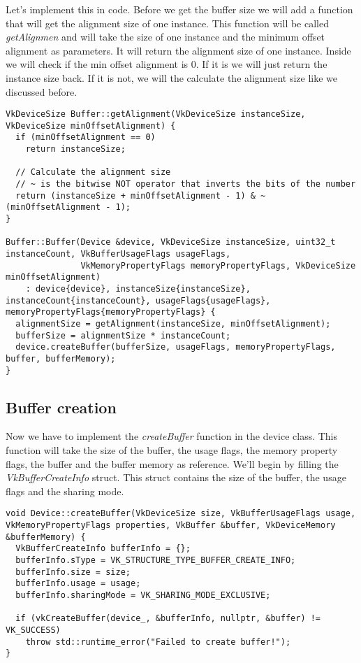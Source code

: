 \documentclass[12pt]{report} \usepackage{preamble}
\begin{document}
Let's implement this in code.
Before we get the buffer size we will add a function that will get the alignment size of one instance. This function will be called \textit{getAlignmen}
and will take the size of one instance and the minimum offset alignment as parameters. It will return the alignment size of one instance.
Inside we will check if the min offset alignment is 0. If it is we will just return the instance size back. If it is not, we will
the calculate the alignment size like we discussed before.

\begin{lstlisting}[Language=C++]
VkDeviceSize Buffer::getAlignment(VkDeviceSize instanceSize, VkDeviceSize minOffsetAlignment) {
  if (minOffsetAlignment == 0)
    return instanceSize;

  // Calculate the alignment size
  // ~ is the bitwise NOT operator that inverts the bits of the number
  return (instanceSize + minOffsetAlignment - 1) & ~(minOffsetAlignment - 1);
}

Buffer::Buffer(Device &device, VkDeviceSize instanceSize, uint32_t instanceCount, VkBufferUsageFlags usageFlags, 
               VkMemoryPropertyFlags memoryPropertyFlags, VkDeviceSize minOffsetAlignment) 
    : device{device}, instanceSize{instanceSize}, instanceCount{instanceCount}, usageFlags{usageFlags}, memoryPropertyFlags{memoryPropertyFlags} {
  alignmentSize = getAlignment(instanceSize, minOffsetAlignment);
  bufferSize = alignmentSize * instanceCount;
  device.createBuffer(bufferSize, usageFlags, memoryPropertyFlags, buffer, bufferMemory);
}
\end{lstlisting}

\subsection{Buffer creation}

Now we have to implement the \textit{createBuffer} function in the device class.
This function will take the size of the buffer, the usage flags, the memory property flags, the buffer and the buffer memory as reference.
We'll begin by filling the \textit{VkBufferCreateInfo} struct. This struct contains the size of the buffer, the usage flags and the sharing mode.

\begin{lstlisting}[Language=C++]
void Device::createBuffer(VkDeviceSize size, VkBufferUsageFlags usage, VkMemoryPropertyFlags properties, VkBuffer &buffer, VkDeviceMemory &bufferMemory) {
  VkBufferCreateInfo bufferInfo = {};
  bufferInfo.sType = VK_STRUCTURE_TYPE_BUFFER_CREATE_INFO;
  bufferInfo.size = size;
  bufferInfo.usage = usage;
  bufferInfo.sharingMode = VK_SHARING_MODE_EXCLUSIVE;

  if (vkCreateBuffer(device_, &bufferInfo, nullptr, &buffer) != VK_SUCCESS)
    throw std::runtime_error("Failed to create buffer!");
}
\end{lstlisting}
\end{document}

